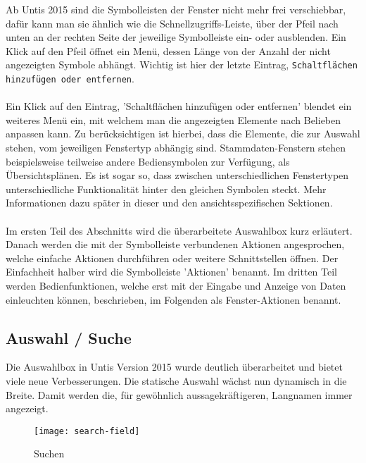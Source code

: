 Ab Untis 2015 sind die Symbolleisten der Fenster nicht mehr frei verschiebbar, dafür kann man sie ähnlich wie die Schnellzugriffs-Leiste, über der Pfeil nach unten an der rechten Seite der jeweilige Symbolleiste ein- oder ausblenden. Ein Klick auf den Pfeil öffnet ein Menü, dessen Länge von der Anzahl der nicht angezeigten Symbole abhängt. Wichtig ist hier der letzte Eintrag, \texttt{Schaltflächen hinzufügen oder entfernen}.\\
\\
Ein Klick auf den Eintrag, 'Schaltflächen hinzufügen oder entfernen' blendet ein weiteres Menü ein, mit welchem man die angezeigten Elemente nach Belieben anpassen kann. Zu berücksichtigen ist hierbei, dass die Elemente, die zur Auswahl stehen, vom jeweiligen Fenstertyp abhängig sind. Stammdaten-Fenstern stehen beispielsweise teilweise andere Bediensymbolen zur Verfügung, als Übersichtsplänen. Es ist sogar so, dass zwischen unterschiedlichen Fenstertypen unterschiedliche Funktionalität hinter den gleichen Symbolen steckt. Mehr Informationen dazu später in dieser und den ansichtsspezifischen Sektionen.\\
\\
Im ersten Teil des Abschnitts wird die überarbeitete Auswahlbox kurz erläutert. Danach werden die mit der Symbolleiste verbundenen Aktionen angesprochen, welche einfache Aktionen durchführen oder weitere Schnittstellen öffnen. Der Einfachheit halber wird die Symbolleiste 'Aktionen' benannt. Im dritten Teil werden Bedienfunktionen, welche erst mit der Eingabe und Anzeige von Daten einleuchten können, beschrieben, im Folgenden als Fenster-Aktionen benannt.

\subsection{Auswahl / Suche}

Die Auswahlbox in Untis Version 2015 wurde deutlich überarbeitet und bietet viele neue Verbesserungen. Die statische Auswahl wächst nun dynamisch in die Breite. Damit werden die, für gewöhnlich aussagekräftigeren, Langnamen immer angezeigt.\\

\begin{wrapfigure}{r}{.4\textwidth}
	\vspace{-13pt}
	\texttt{[image: search-field]}
	\vspace{-5pt}
	\caption{Suchen}
	\label{fig:search-field}
\end{wrapfigure}


